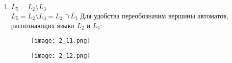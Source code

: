 \documentclass[12pt, a4paper]{article}
\begin{document}
\begin{enumerate}
    \item \(L_5=L_2 \setminus L_3\)
\\\(L_5=L_2 \setminus L_3=L_2 \cap \overline{L_3}\)
Для удобства переобозначим вершины автоматов, распознающих языки \(L_2\) и \(\overline{L_3}\):

\begin{comment}
digraph {
    rankdir="LR"
    "" [shape=point]
    Q1 [shape=circle]
    Q2 [shape=circle]
    Q3 [shape=circle]
    Q4 [shape=doublecircle]
    Q5 [shape=circle]
    
    "" -> Q1
    Q1 -> Q2 [label="a,b"]
    Q2 -> Q3 [label="a,b"]
    Q3 -> Q4 [label="a,b"]
    Q5 -> Q4 [label="a,b"]
    Q4 -> Q5 [label="a,b"]
}
\end{comment}

    \begin{figure}[H]
        \centering
        \texttt{[image: 2\_11.png]}
    \end{figure}

\begin{comment}
digraph {
    rankdir="LR"
    "" [shape=point]
    Q6 [shape=circle]
    Q7 [shape=doublecircle]
    Q8 [shape=doublecircle]
    Q9 [shape=doublecircle]
    Q10 [shape=doublecircle]
    Q11 [shape=doublecircle]
    
    "" -> Q6
    Q6 -> Q7 [label="a"]
    Q6 -> Q8 [label="b"]
    Q8 -> Q9 [label="a"]
    Q8 -> Q10 [label="b"]
    Q10 -> Q11 [label="a"]
    Q10 -> Q6 [label="b"]
    Q7 -> Q6 [label="a"]
    Q7 -> Q9 [label="b"]
    Q9 -> Q8 [label="a"]
    Q9 -> Q11 [label="b"]
    Q11 -> Q10 [label="a"]
    Q11 -> Q7 [label="b"]
}
\end{comment}

    \begin{figure}[H]
        \centering
        \texttt{[image: 2\_12.png]}
    \end{figure}


\end{enumerate}
\end{document}
